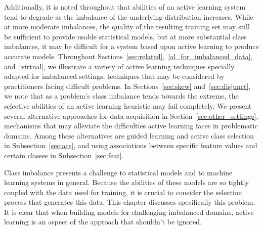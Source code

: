Additionally, it is noted throughout that abilities of an active learning system tend to degrade as the imbalance of the underlying distribution increases. While at more moderate imbalances, the quality of the resulting training set may still be sufficient to provide usable statistical models, but at more substantial class imbalances, it may be difficult for a system based upon active learning to produce accurate models. Throughout Sections~\ref{sec:related},~\ref{al_for_imbalanced_data}, and~\ref{virtual}, we illustrate a variety of active learning techniques specially adapted for imbalanced settings, techniques that may be considered by practitioners facing difficult problems. In Sections~\ref{sec:skew} and~\ref{sec:disjunct}, we note that as a problem's class imbalance tends towards the extreme, the selective abilities of an active learning heuristic may fail completely. We present several alternative approaches for data acquisition in Section~\ref{sec:other_settings}, mechanisms that may alleviate the difficulties active learning faces in problematic domains. Among these alternatives are guided learning and active class selection in Subsection~\ref{sec:acs}, and using associations between specific feature values and certain classes in Subsection~\ref{sec:feat}.

Class imbalance presents a challenge to statistical models and to machine learning systems in general. Because the abilities of these models are so tightly coupled with the data used for training, it is crucial to consider the selection process that generates this data. This chapter discusses specifically this problem. It is clear that when building models for challenging imbalanced domains, active learning is an aspect of the approach that shouldn't be ignored.
